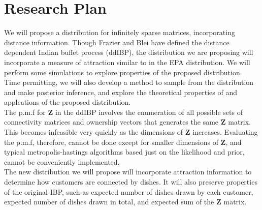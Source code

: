 \chapter{Research Plan}%

We will propose a distribution for infinitely sparse matrices, incorporating
distance information. Though Frazier and Blei have defined the distance
dependent Indian buffet process (ddIBP), the distribution we are proposing will
incorporate a measure of attraction similar to in the EPA distribution. We will
perform some simulations to explore properties of the proposed distribution.
Time permitting, we will also develop a method to sample from the distribution
and make posterior inference, and explore the theoretical properties of and
applcations of the proposed distribution. \\

\noindent
The p.m.f for $\bm Z$ in the ddIBP involves the enumeration of all possible sets
of connectivity matrices and ownership vectors that generates the same $\bm Z$ 
matrix. This becomes infeasible very quickly as the dimensions of $\bm Z$ 
increases. Evaluating the p.m.f, therefore, cannot be done except for smaller
dimensions of $\bm Z$, and typical metropolis-hastings algorithms based just on 
the likelihood and prior, cannot be conveniently implemented.\\

\noindent
The new distribution we will propose will incorporate attraction information to
determine how customers are connected by dishes. It will also preserve properties 
of the original IBP, such as expected number of dishes drawn by each customer,
expected number of dishes drawn in total, and expected sum of the $\bm Z$ matrix.

